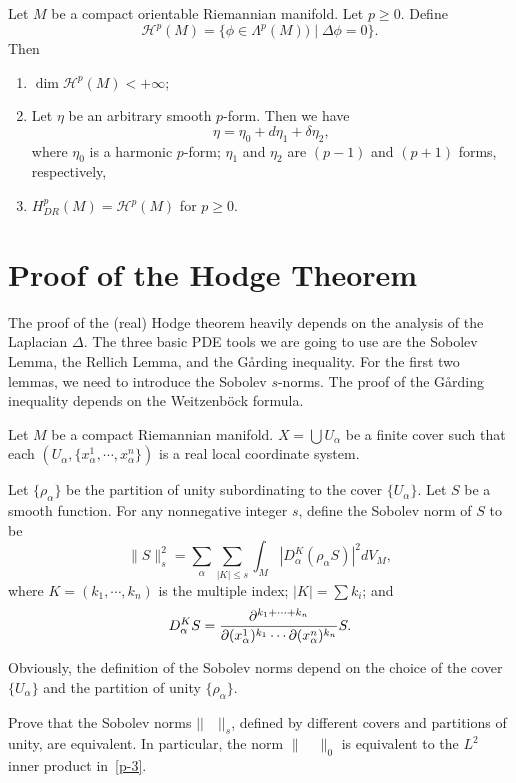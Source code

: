\begin{theorem} 
Let $M$ be a compact orientable Riemannian manifold. Let $p\geq 0$. Define
\[
\mathcal
H^p(M)=\{\phi\in\Lambda^p(M))\mid \Delta\phi=0\}.
\]
Then
\begin{enumerate}
\item $\dim \mathcal H^p(M)<+\infty$;
\item Let $\eta$ be an arbitrary smooth $p$-form. Then
we have
\[
\eta=\eta_0+d\eta_1+\delta\eta_2,
\]
where $\eta_0$ is a harmonic $p$-form; $\eta_1$ and $\eta_2$
are $(p-1)$ and $(p+1)$ forms, respectively,
\item $H^p_{DR}(M)=\mathcal
H^p(M)$ for $p\geq 0$.
\end{enumerate}
\end{theorem}


\section{Proof of the Hodge Theorem}\label{Proof_Hodge}
The proof of the (real) Hodge theorem heavily
depends on the analysis of the Laplacian
$\Delta$. The three basic PDE
tools we are going to use  are the Sobolev Lemma, the
Rellich Lemma, and the G\aa rding inequality. For the first
two lemmas, we need to introduce the  Sobolev $s$-norms. The
proof of the G\aa rding inequality
depends on the Weitzenb\"ock formula.



Let $M$ be a compact Riemannian manifold.
 $X=\bigcup U_\alpha$ be a  finite cover such that
each $(U_\alpha, \{x_\alpha^1,\cdots, x^{n}_\alpha\})$
is a real  local coordinate system.

Let $\{\rho_\alpha\}$ be the partition of unity subordinating
to the cover $\{U_\alpha\}$. Let $S$ be a smooth
function. For
any nonnegative integer
$s$, define the Sobolev norm of $S$ to be
\[
\|S\|_s^2=\sum_\alpha\sum_{|K|\leq s}\int_M
|D_\alpha^K (\rho_\alpha S)|^2 dV_M,
\]
where $K=(k_1,\cdots,k_{n})$ is the multiple index;
$|K|=\sum k_i$; and
\[
D_\alpha^K S=\frac{\partial^{k_1+\cdots+k_{n}}}{
\partial (x_\alpha^1)^{k_1}\cdots \partial (x_\alpha^{n})^{k_{n}}}
S.
\]

Obviously, the definition of the Sobolev norms depend on
the choice of the cover $\{U_\alpha\}$ and the partition
of unity $\{\rho_\alpha\}$. 

\begin{ex}
Prove that the Sobolev norms
$||\quad||_s$, defined by different covers and partitions
of unity, are equivalent. In particular, the norm $\|\quad\|_0$
is equivalent to the $L^2$ inner product in~\eqref{p-3}.
\end{ex}

